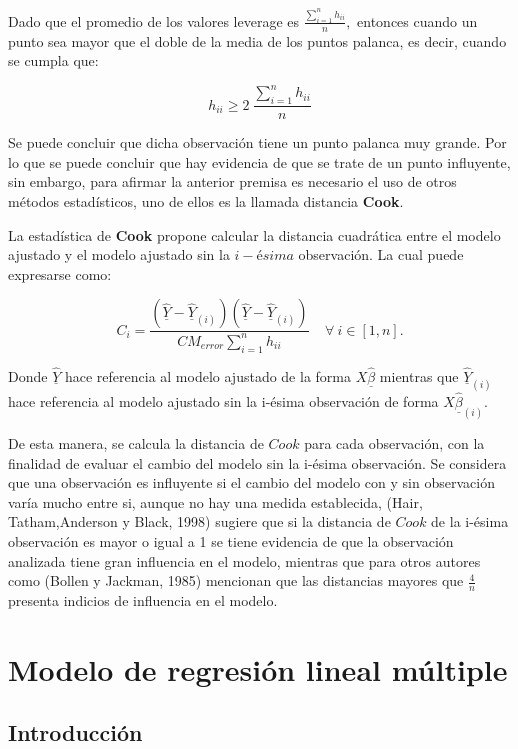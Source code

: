 \documentclass[
  a4paper,
  oneside,
  openany]{book}
\begin{document}
Dado que el promedio de los valores leverage es \(\frac{\sum_{i=1}^{n}h_{ii}}{n},\) entonces cuando un punto sea mayor que el doble de la media de los puntos palanca, es decir, cuando se cumpla que:

\[h_{ii} \geq  2 \ \frac{\sum_{i=1}^{n}h_{ii}}{n}\]

Se puede concluir que dicha observación tiene un punto palanca muy grande. Por lo que se puede concluir que hay evidencia de que se trate de un punto influyente, sin embargo, para afirmar la anterior premisa es necesario el uso de otros métodos estadísticos, uno de ellos es la llamada distancia \textbf{Cook}.

La estadística de \textbf{Cook} propone calcular la distancia cuadrática entre el modelo ajustado y el modelo ajustado sin la \(i-ésima\) observación. La cual puede expresarse como:

\[C_{i}=\frac{\left(\underline{\hat{Y}}-\underline{\hat{Y}}_{(i)}\right)\left(\underline{\hat{Y}}-\underline{\hat{Y}}_{(i)}\right)}{CM_{error}\sum_{i=1}^{n}h_{ii}} \ \ \ \ \  \forall \ i \in [1,n].\]

Donde \(\underline{\hat{Y}}\) hace referencia al modelo ajustado de la forma \(X\underline{\hat{\beta}}\) mientras que \(\underline{\hat{Y}}_{(i)}\) hace referencia al modelo ajustado sin la i-ésima observación de forma \(X\underline{\hat{\beta}}_{(i)}\).

De esta manera, se calcula la distancia de \(Cook\) para cada observación, con la finalidad de evaluar el cambio del modelo sin la i-ésima observación. Se considera que una observación es influyente si el cambio del modelo con y sin observación varía mucho entre si, aunque no hay una medida establecida, (Hair, Tatham,Anderson y Black, 1998) sugiere que si la distancia de \(Cook\) de la i-ésima observación es mayor o igual a 1 se tiene evidencia de que la observación analizada tiene gran influencia en el modelo, mientras que para otros autores como (Bollen y Jackman, 1985) mencionan que las distancias mayores que \(\frac{4}{n}\) presenta indicios de influencia en el modelo.

\hypertarget{part-modelo-de-regresiuxf3n-lineal-muxfaltiple}{%
\part{Modelo de regresión lineal múltiple}\label{part-modelo-de-regresiuxf3n-lineal-muxfaltiple}}

\hypertarget{introducciuxf3n-5}{%
\chapter*{Introducción}\label{introducciuxf3n-5}}
\end{document}
